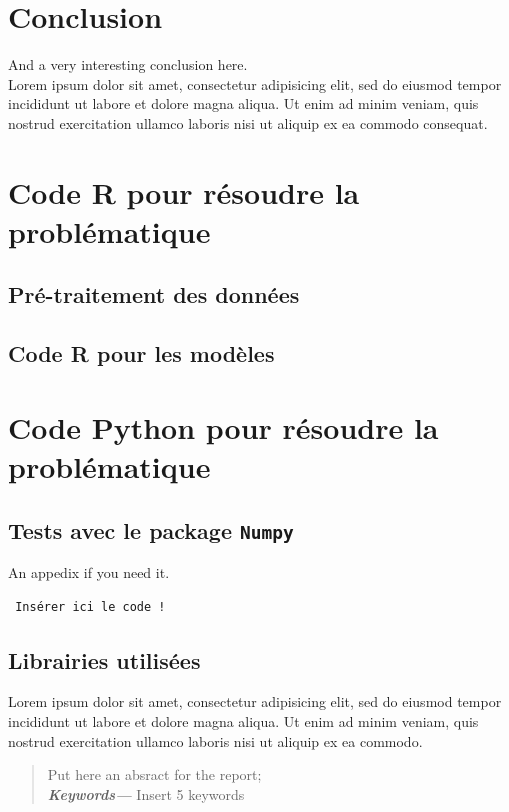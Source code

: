 \documentclass[a4paper, oneside]{report}
\providecommand{\keywords}[1]{\textbf{\textit{Keywords---}} #1}
\begin{document}
\chapter*{Conclusion}
\label{chap:conclusion}
%
  And a very interesting conclusion here\@. ~\\
  Lorem ipsum dolor sit amet, consectetur adipisicing elit, sed do eiusmod
  tempor incididunt ut labore et dolore magna aliqua. Ut enim ad minim veniam,
  quis nostrud exercitation ullamco laboris nisi ut aliquip ex ea commodo
  consequat.

\newpage
\appendix
{}

\chapter{Code R pour résoudre la problématique}
\label{chap:appendix}


\section{Pré-traitement des données}
\section{Code R pour les modèles}

\chapter{Code Python pour résoudre la problématique}
\label{chap:appendixB}
\section{Tests avec le package {\tt Numpy}}

 An appedix if you need it.
 
 \begin{verbatim}
 Insérer ici le code !
 \end{verbatim}

\section{Librairies utilisées}
 
  Lorem ipsum dolor sit amet, consectetur adipisicing elit, sed do eiusmod
  tempor incididunt ut labore et dolore magna aliqua. Ut enim ad minim veniam,
  quis nostrud exercitation ullamco laboris nisi ut aliquip ex ea commodo.






\cleardoublepage%


\printglossaries
\printindex

\begin{abstract}

Put here an absract for the report; \\

\keywords{Insert 5 keywords}
\end{abstract}
\end{document}

